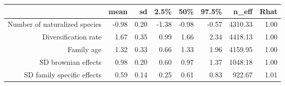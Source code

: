 \begin{table}[ht]
\centering
\begin{tabular}{rrrrrrrr}
  \hline
 & mean & sd & 2.5\% & 50\% & 97.5\% & n\_eff & Rhat \\ 
  \hline
Number of naturalized species & -0.98 & 0.20 & -1.38 & -0.98 & -0.57 & 4310.33 & 1.00 \\ 
  Diversification rate & 1.67 & 0.35 & 0.99 & 1.66 & 2.34 & 4418.13 & 1.00 \\ 
  Family age & 1.32 & 0.33 & 0.66 & 1.33 & 1.96 & 4159.95 & 1.00 \\ 
  SD brownian effects & 0.98 & 0.20 & 0.60 & 0.97 & 1.37 & 1048.18 & 1.00 \\ 
  SD family specific effects & 0.59 & 0.14 & 0.25 & 0.61 & 0.83 & 922.67 & 1.01 \\ 
   \hline
\end{tabular}
\end{table}
